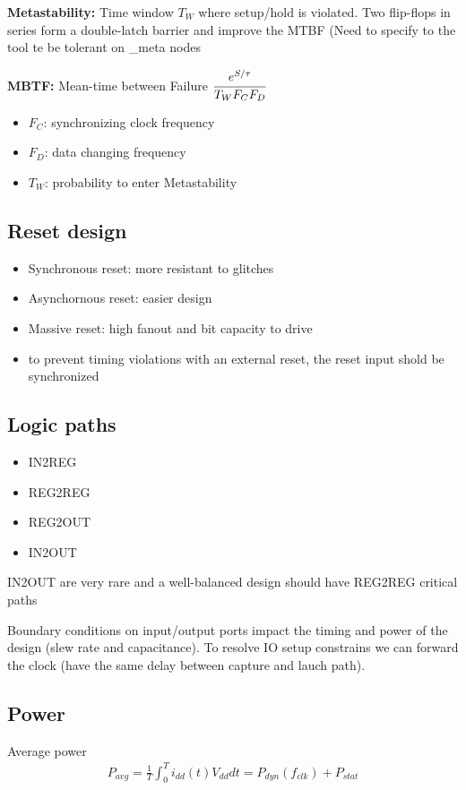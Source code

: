 \textbf{Metastability:} Time window \(T_W\) where setup/hold is violated. Two flip-flops in series form a double-latch barrier and improve the MTBF (Need to specify to the tool te be tolerant on \_meta nodes

\textbf{MBTF:} Mean-time between Failure \( \cfrac{e^{S/\tau}}{T_WF_CF_D}\)
\begin{itemize}
  \item \(F_C\): synchronizing clock frequency
  \item \(F_D\): data changing frequency
\item \(T_W\): probability to enter Metastability
\end{itemize}


\subsection{Reset design}
\begin{itemize}
  \item Synchronous reset: more resistant to glitches
  \item Asynchornous reset: easier design
  \item Massive reset: high fanout and bit capacity to drive
  \item to prevent timing violations with an external reset, the reset input shold be synchronized
\end{itemize}

\subsection{Logic paths}
\begin{itemize}
  \item IN2REG
  \item REG2REG
  \item REG2OUT
  \item IN2OUT
\end{itemize}
IN2OUT are very rare and a well-balanced design should have REG2REG critical paths

\bigbreak
Boundary conditions on input/output ports impact the timing and power of the design (slew rate and capacitance). To resolve IO setup constrains we can forward the clock (have the same delay between capture and lauch path).


\subsection{Power}
Average power
\begin{align}
P_{avg} = \frac{1}{T} \int_0^T i_{dd}(t) V_{dd}dt = P_{dyn}(f_{clk}) + P_{stat}
\end{align}

